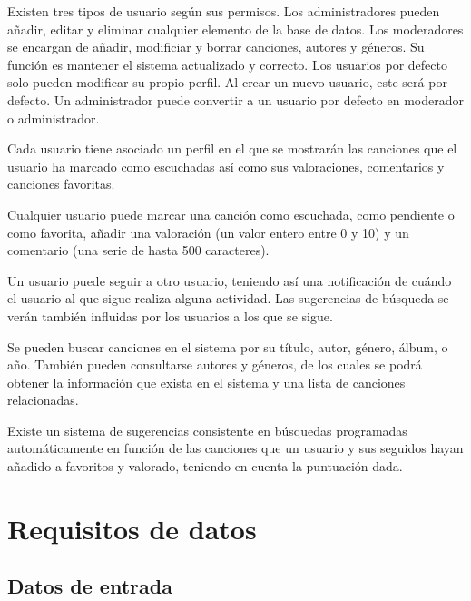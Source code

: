 \documentclass[
  12pt,
  a4paper,
  DIV=12,
  spanish,
]{scrartcl}
\begin{document}
Existen tres tipos de usuario según sus permisos. Los administradores pueden añadir, editar y eliminar cualquier elemento de la base de datos. Los moderadores se encargan de añadir, modificiar y borrar canciones, autores y géneros. Su función es mantener el sistema actualizado y correcto. Los usuarios por defecto solo pueden modificar su propio perfil. Al crear un nuevo usuario, este será por defecto. Un administrador puede convertir a un usuario por defecto en moderador o administrador.

Cada usuario tiene asociado un perfil en el que se mostrarán las canciones que el usuario ha marcado como escuchadas así como sus valoraciones, comentarios y canciones favoritas. 


Cualquier usuario puede marcar una canción como escuchada, como pendiente o como favorita, añadir una valoración (un valor entero entre 0 y 10) y un comentario (una serie de hasta 500 caracteres). 

Un usuario puede seguir a otro usuario, teniendo así una notificación de cuándo el usuario al que sigue realiza alguna actividad. Las sugerencias de búsqueda se verán también influidas por los usuarios a los que se sigue. 



Se pueden buscar canciones en el sistema por su título, autor, género, álbum, o año. También pueden consultarse autores y géneros, de los cuales se podrá obtener la información que exista en el sistema y una lista de canciones relacionadas. 

Existe un sistema de sugerencias consistente en búsquedas programadas automáticamente en función de las canciones que un usuario y sus seguidos hayan añadido a favoritos y valorado, teniendo en cuenta la puntuación dada.

\section{Requisitos de datos}
\subsection{Datos de entrada}
\end{document}
